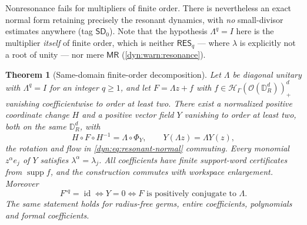 \documentclass[11pt,letterpaper]{article}
\newtheorem{theorem}{Theorem}[section]
\theoremstyle{definition}
\theoremstyle{remark}
\newcommand{\HH}{\mathscr H}
\newcommand{\OO}{\mathcal O}
\newcommand{\id}{\operatorname{id}}
\newcommand{\supp}{\operatorname{supp}}
\newcommand{\sdz}{\mathsf{SD}_{0}}
\newcommand{\resq}{\mathsf{RES}_q}
\newcommand{\mres}{\mathsf{MR}}
\numberwithin{equation}{section}
\begin{document}
Nonresonance fails for multipliers of finite order. There is nevertheless
an exact normal form retaining precisely the resonant dynamics, with
\emph{no} small-divisor estimates anywhere (tag $\sdz$). Note that the
hypothesis $\Lambda^{q}=I$ here is the multiplier \emph{itself} of finite
order, which is neither $\resq$ --- where $\lambda$ is explicitly not a
root of unity --- nor mere $\mres$ (\cref{dyn:warn:resonance}).

\begin{theorem}[Same-domain finite-order decomposition]
\label{dyn:thm:finite-order}
Let $\Lambda$ be diagonal unitary with $\Lambda^{q}=I$ for an integer
$q\ge1$, and let $F=\Lambda z+f$ with
$f\in\HH_\Gamma(\OO(\mathbb D_R^{d}))_+^{d}$ vanishing coefficientwise to
order at least two. There exist a normalized positive coordinate change
$H$ and a positive vector field $Y$ vanishing to order at least two, both
on the \emph{same} $\mathbb D_R^{d}$, with
\begin{equation}\label{dyn:eq:resonant-normal}
 H\circ F\circ H^{-1}=\Lambda\circ\Phi_Y,\qquad Y(\Lambda z)=\Lambda Y(z),
\end{equation}
the rotation and flow in \eqref{dyn:eq:resonant-normal} commuting. Every
monomial $z^{\alpha}e_j$ of $Y$ satisfies $\lambda^{\alpha}=\lambda_j$. All
coefficients have finite support-word certificates from $\supp f$, and the
construction commutes with workspace enlargement. Moreover
\begin{equation}\label{dyn:eq:finiteorder-equivalence}
 F^{\circ q}=\id\iff Y=0\iff
 F\text{ is positively conjugate to }\Lambda .
\end{equation}
The same statement holds for radius-free germs, entire coefficients,
polynomials and formal coefficients.
\end{theorem}
\end{document}
